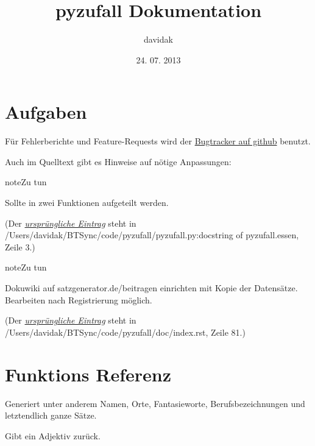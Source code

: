 \documentclass[a4paper,12pt,oneside]{sphinxmanual}
\title{pyzufall Dokumentation}
\date{24. 07. 2013}
\author{davidak}
\begin{document}
\maketitle
\tableofcontents
{}\label{index::doc}



\chapter{Aufgaben}
\label{todo::doc}\label{todo:dokumentation-von-pyzufall}\label{todo:aufgaben}
Für Fehlerberichte und Feature-Requests wird der \href{https://github.com/davidak/pyzufall/issues}{Bugtracker auf github} benutzt.

Auch im Quelltext gibt es Hinweise auf nötige Anpassungen:

\begin{notice}{note}{Zu tun}

Sollte in zwei Funktionen aufgeteilt werden.
\end{notice}

(Der {\hyperref[funktionen:index-0]{\emph{ursprüngliche Eintrag}}} steht in /Users/davidak/BTSync/code/pyzufall/pyzufall.py:docstring of pyzufall.essen, Zeile 3.)

\begin{notice}{note}{Zu tun}

Dokuwiki auf satzgenerator.de/beitragen einrichten mit Kopie der Datensätze. Bearbeiten nach Registrierung möglich.
\end{notice}

(Der {\hyperref[index:index-0]{\emph{ursprüngliche Eintrag}}} steht in /Users/davidak/BTSync/code/pyzufall/doc/index.rst, Zeile 81.)


\chapter{Funktions Referenz}
\label{funktionen:funktions-referenz}\label{funktionen::doc}\label{funktionen:module-pyzufall}
Generiert unter anderem Namen, Orte, Fantasieworte, Berufsbezeichnungen und letztendlich ganze Sätze.

\begin{fulllineitems}
\label{funktionen:pyzufall.adj}
Gibt ein Adjektiv zurück.

\end{fulllineitems}
\end{document}
